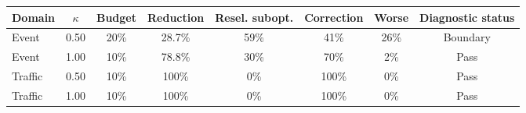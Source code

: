 \begin{tabular}{lccccccc}
\toprule
Domain & \(\kappa\) & Budget & Reduction & Resel. subopt. & Correction & Worse & Diagnostic status \\
\midrule
Event & 0.50 & 20\% & 28.7\% & 59\% & 41\% & 26\% & Boundary \\
Event & 1.00 & 10\% & 78.8\% & 30\% & 70\% & 2\% & Pass \\
Traffic & 0.50 & 10\% & 100\% & 0\% & 100\% & 0\% & Pass \\
Traffic & 1.00 & 10\% & 100\% & 0\% & 100\% & 0\% & Pass \\
\bottomrule
\end{tabular}
